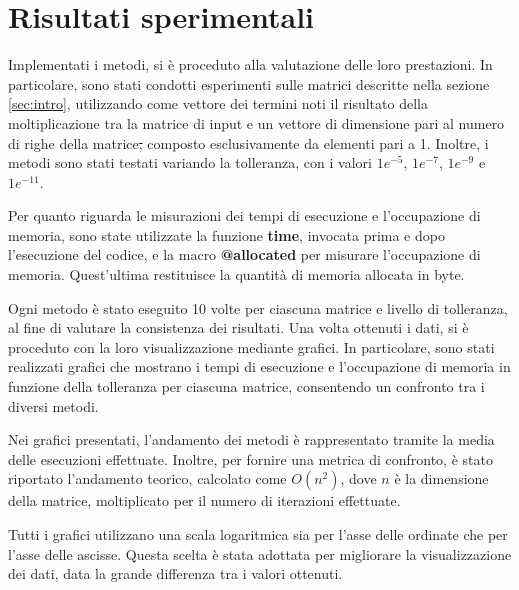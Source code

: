 \section{Risultati sperimentali}
Implementati i metodi, si è proceduto alla valutazione delle loro prestazioni.
In particolare, sono stati condotti esperimenti sulle matrici descritte nella
sezione \ref{sec:intro}, utilizzando come vettore dei termini noti il risultato
della moltiplicazione tra la matrice di input e un vettore di dimensione pari al
numero di righe della matrice\st{,} composto esclusivamente da elementi pari a 1.
Inoltre, i metodi sono stati testati variando la tolleranza, con i valori $1e^{-5}$,
$1e^{-7}$, $1e^{-9}$ e $1e^{-11}$.

Per quanto riguarda le misurazioni dei tempi di esecuzione e l'occupazione di
memoria, sono state utilizzate la funzione \textbf{time}, invocata prima e dopo
l'esecuzione del codice, e la macro \textbf{@allocated} per misurare l'occupazione
di memoria. Quest'ultima restituisce la quantità di memoria allocata in byte.

Ogni metodo è stato eseguito 10 volte per ciascuna matrice e livello di tolleranza,
al fine di valutare la consistenza dei risultati. Una volta ottenuti i dati, si è
proceduto con la loro visualizzazione mediante grafici. In particolare, sono stati
realizzati grafici che mostrano i tempi di esecuzione e l'occupazione di memoria
in funzione della tolleranza per ciascuna matrice, consentendo un confronto tra
i diversi metodi.

Nei grafici presentati, l'andamento dei metodi è rappresentato tramite la media
delle esecuzioni effettuate. Inoltre, per fornire una metrica di confronto, è
stato riportato l'andamento teorico, calcolato come $O(n^2)$, dove $n$ è la
dimensione della matrice, moltiplicato per il numero di iterazioni effettuate.

Tutti i grafici utilizzano una scala logaritmica sia per l'asse delle ordinate
che per l'asse delle ascisse. Questa scelta è stata adottata per migliorare la
visualizzazione dei dati, data la grande differenza tra i valori ottenuti.

